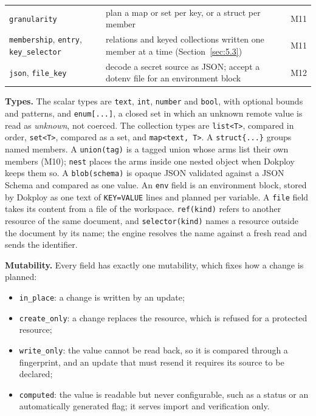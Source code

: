 \begin{table}[tbp]
\begin{tabularx}{\linewidth}{LLl}
\texttt{granularity} & plan a map or set per key, or a struct per member & M11 \\
\texttt{membership}, \texttt{entry}, \texttt{key\_selector} & relations and keyed collections written one member at a time (Section~\ref{sec:5.3}) & M11 \\
\texttt{json}, \texttt{file\_key} & decode a secret source as JSON; accept a dotenv file for an environment block & M12 \\
\bottomrule
\end{tabularx}
\end{table}

\textbf{Types.} The scalar types are \texttt{text}, \texttt{int}, \texttt{number} and \texttt{bool}, with optional bounds and patterns,
and \texttt{enum{[}...{]}}, a closed set in which an unknown remote value is read as \emph{unknown}, not coerced. The
collection types are \texttt{list\textless{}T\textgreater{}}, compared in order, \texttt{set\textless{}T\textgreater{}}, compared as a set, and \texttt{map\textless{}text,\ T\textgreater{}}. A
\texttt{struct\{...\}} groups named members. A \texttt{union(tag)} is a tagged union whose arms list their own members
(M10); \texttt{nest} places the arms inside one nested object when Dokploy keeps them so. A \texttt{blob(schema)} is
opaque JSON validated against a JSON Schema and compared as one value. An \texttt{env} field is an
environment block, stored by Dokploy as one text of \texttt{KEY=VALUE} lines and planned per variable. A
\texttt{file} field takes its content from a file of the workspace. \texttt{ref(kind)} refers to another resource
of the same document, and \texttt{selector(kind)} names a resource outside the document by its name; the
engine resolves the name against a fresh read and sends the identifier.

\textbf{Mutability.} Every field has exactly one mutability, which fixes how a change is planned:

\begin{itemize}
\item
  \texttt{in\_place}: a change is written by an update;
\item
  \texttt{create\_only}: a change replaces the resource, which is refused for a protected resource;
\item
  \texttt{write\_only}: the value cannot be read back, so it is compared through a fingerprint, and an update
  that must resend it requires its source to be declared;
\item
  \texttt{computed}: the value is readable but never configurable, such as a status or an automatically
  generated flag; it serves import and verification only.
\end{itemize}

